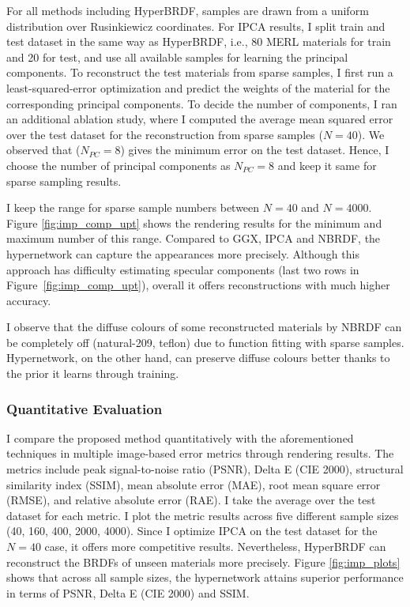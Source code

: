 For all methods including HyperBRDF, samples are drawn from a uniform distribution over Rusinkiewicz coordinates. For IPCA results, I split train and test dataset in the same way as HyperBRDF, i.e., 80 MERL materials for train and 20 for test, and use all available samples for learning the principal components. To reconstruct the test materials from sparse samples, I first run a least-squared-error optimization and predict the weights of the material for the corresponding principal components. To decide the number of components, I ran an additional ablation study, where 
I computed the average mean squared error over the test dataset for the reconstruction from sparse samples ($N = 40$). We observed that ($N_{PC} = 8$) gives the minimum error on the test dataset. Hence, I choose the number of principal components as $N_{PC} = 8$ and keep it same for sparse sampling results.

 
I keep the range for sparse sample numbers between $N = 40$ and $N = 4000$. Figure \ref{fig:imp_comp_upt} shows the rendering results for the minimum and maximum number of this range. Compared to GGX, IPCA and NBRDF, the hypernetwork can capture the appearances more precisely. Although this approach has difficulty estimating specular components (last two rows in Figure~\ref{fig:imp_comp_upt}), overall it offers reconstructions with much higher accuracy. 

I observe that the diffuse colours of some reconstructed materials by NBRDF can be completely off (natural-209, teflon) due to function fitting with sparse samples. Hypernetwork, on the other hand, can preserve diffuse colours better thanks to the prior it learns through training.


\subsubsection{Quantitative Evaluation}

I compare the proposed method quantitatively with the aforementioned techniques in multiple image-based error metrics through rendering results. The metrics include peak signal-to-noise ratio (PSNR), Delta E (CIE 2000), structural similarity index (SSIM), mean absolute error (MAE), root mean square error (RMSE), and relative absolute error (RAE). I take the average over the test dataset for each metric. I plot the metric results across five different sample sizes (40, 160, 400, 2000, 4000). Since I optimize IPCA on the test dataset for the $N = 40$ case, it offers more competitive results. Nevertheless, HyperBRDF can reconstruct the BRDFs of unseen materials more precisely. Figure \ref{fig:imp_plots} shows that across all sample sizes, the hypernetwork attains superior performance in terms of PSNR, Delta E (CIE 2000) and SSIM. 

